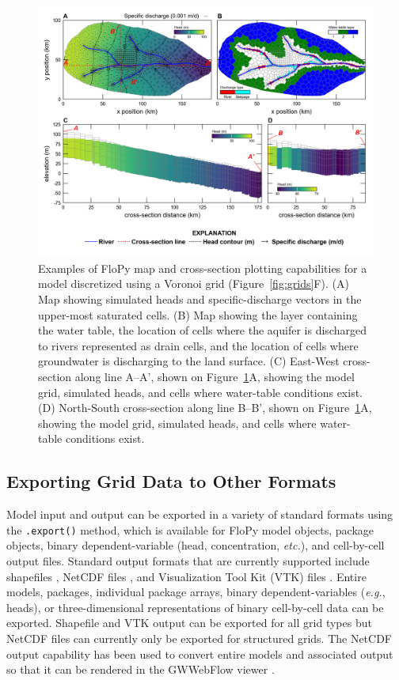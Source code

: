 \documentclass[12pt, oneside]{article}  	%
\begin{document}
\begin{figure}[ht!]
	\begin{center}
		\includegraphics{figures/grids_flopy_plots.png}
	\end{center}
	\caption{Examples of FloPy map and cross-section plotting capabilities for a model discretized using a Voronoi grid (Figure~\ref{fig:grids}F). (A) Map showing simulated heads and specific-discharge vectors in the upper-most saturated cells. (B) Map showing the layer containing the water table, the location of cells where the aquifer is discharged to rivers represented as drain cells, and the location of cells where groundwater is discharging to the land surface. (C) East-West cross-section along line A--A', shown on Figure~\ref{fig:flopyplots}A, showing the model grid, simulated heads, and cells where water-table conditions exist. (D) North-South cross-section along line B--B', shown on Figure~\ref{fig:flopyplots}A, showing the model grid, simulated heads, and cells where water-table conditions exist.}
	\label{fig:flopyplots}
\end{figure}

\subsection*{Exporting Grid Data to Other Formats}

Model input and output can be exported in a variety of standard formats using the \texttt{.export()} method, which is available for FloPy model objects, package objects, binary dependent-variable (head, concentration, \textit{etc.}), and cell-by-cell output files. Standard output formats that are currently supported include shapefiles \citep{environmental1998esri}, NetCDF files \citep{rew2006netcdf, rew1990netcdf}, and Visualization Tool Kit (VTK) files \citep{schroeder:2006:VTK}. Entire models, packages, individual package arrays, binary dependent-variables (\textit{e.g.}, heads), or three-dimensional representations of binary cell-by-cell data can be exported. Shapefile and VTK output can be exported for all grid types but NetCDF files can currently only be exported for structured grids. The NetCDF output capability has been used to convert entire models and associated output so that it can be rendered in the GWWebFlow viewer \citep{gswebflow2018}.
\end{document}
